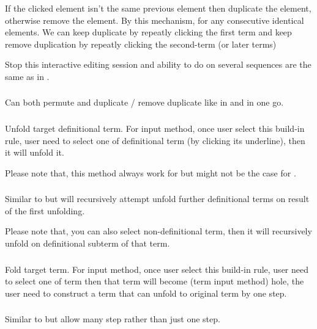 \documentclass[11pt, a4paper]{article}
\begin{document}
If the clicked element isn't the same previous element then duplicate the element, otherwise remove the element. By this mechanism, for any consecutive identical elements. We can keep duplicate by repeatly clicking the first term and keep remove duplication by repeatly clicking the second-term (or later terms)

Stop this interactive editing session and ability to do on several sequences are the same as in .

\subsubsection{}
Can both permute and duplicate / remove duplicate like in  and  in one go.


\subsubsection{}
Unfold target definitional term. For input method, once user select this build-in rule, user need to select one of definitional term (by clicking its underline), then it will unfold it.

Please note that, this method always work for \kTotal \kDefinition but might not be the case for \kPartial \kDefinition.

\subsubsection{}
Similar to  but will recursively attempt unfold further definitional terms on result of the first unfolding.

Please note that, you can also select non-definitional term, then it will recursively unfold on definitional subterm of that term.

\subsubsection{}
Fold target term. For input method, once user select this build-in rule, user need to select one of term then that term will become (term input method) hole, the user need to construct a term that can unfold to original term by one step.

\subsubsection{}
Similar to  but allow many step rather than just one step.
\end{document}
